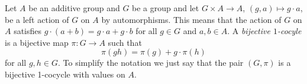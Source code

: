 %
%
%
%
%
%

Let $A$ be an additive group and $G$ be a group and let 
$G\times A\to A$, $(g,a)\mapsto g\cdot a$,
be a left action of $G$ on $A$ by automorphisms. This means that the action of $G$ on $A$ satisfies 
$g\cdot (a+b)=g\cdot a+g\cdot b$ for all $g\in G$ and $a,b\in A$.
A \emph{bijective
$1$-cocyle} is a bijective map $\pi\colon G\to A$ such that 
\begin{equation}
    \label{eq:1cocycle}
    \pi(gh)=\pi(g)+g\cdot \pi(h)
\end{equation}
for all $g,h\in G$. To simplify the notation we 
just say that the pair $(G,\pi)$ is a bijective 1-cocycle with values
on $A$. 

